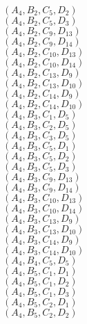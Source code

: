 \documentclass[14pt]{article}
\begin{document}
    $({A}_{4}, {B}_{2}, {C}_{5}, {D}_{2}) $ \\ 
    $({A}_{4}, {B}_{2}, {C}_{5}, {D}_{3}) $ \\ 
    $({A}_{4}, {B}_{2}, {C}_{9}, {D}_{13}) $ \\ 
    $({A}_{4}, {B}_{2}, {C}_{9}, {D}_{14}) $ \\ 
    $({A}_{4}, {B}_{2}, {C}_{10}, {D}_{13}) $ \\ 
    $({A}_{4}, {B}_{2}, {C}_{10}, {D}_{14}) $ \\ 
    $({A}_{4}, {B}_{2}, {C}_{13}, {D}_{9}) $ \\ 
    $({A}_{4}, {B}_{2}, {C}_{13}, {D}_{10}) $ \\ 
    $({A}_{4}, {B}_{2}, {C}_{14}, {D}_{9}) $ \\ 
    $({A}_{4}, {B}_{2}, {C}_{14}, {D}_{10}) $ \\ 
    $({A}_{4}, {B}_{3}, {C}_{1}, {D}_{5}) $ \\ 
    $({A}_{4}, {B}_{3}, {C}_{2}, {D}_{5}) $ \\ 
    $({A}_{4}, {B}_{3}, {C}_{3}, {D}_{5}) $ \\ 
    $({A}_{4}, {B}_{3}, {C}_{5}, {D}_{1}) $ \\ 
    $({A}_{4}, {B}_{3}, {C}_{5}, {D}_{2}) $ \\ 
    $({A}_{4}, {B}_{3}, {C}_{5}, {D}_{3}) $ \\ 
    $({A}_{4}, {B}_{3}, {C}_{9}, {D}_{13}) $ \\ 
    $({A}_{4}, {B}_{3}, {C}_{9}, {D}_{14}) $ \\ 
    $({A}_{4}, {B}_{3}, {C}_{10}, {D}_{13}) $ \\ 
    $({A}_{4}, {B}_{3}, {C}_{10}, {D}_{14}) $ \\ 
    $({A}_{4}, {B}_{3}, {C}_{13}, {D}_{9}) $ \\ 
    $({A}_{4}, {B}_{3}, {C}_{13}, {D}_{10}) $ \\ 
    $({A}_{4}, {B}_{3}, {C}_{14}, {D}_{9}) $ \\ 
    $({A}_{4}, {B}_{3}, {C}_{14}, {D}_{10}) $ \\ 
    $({A}_{4}, {B}_{4}, {C}_{5}, {D}_{5}) $ \\ 
    $({A}_{4}, {B}_{5}, {C}_{1}, {D}_{1}) $ \\ 
    $({A}_{4}, {B}_{5}, {C}_{1}, {D}_{2}) $ \\ 
    $({A}_{4}, {B}_{5}, {C}_{1}, {D}_{3}) $ \\ 
    $({A}_{4}, {B}_{5}, {C}_{2}, {D}_{1}) $ \\ 
    $({A}_{4}, {B}_{5}, {C}_{2}, {D}_{2}) $ \\ 
\end{document}
